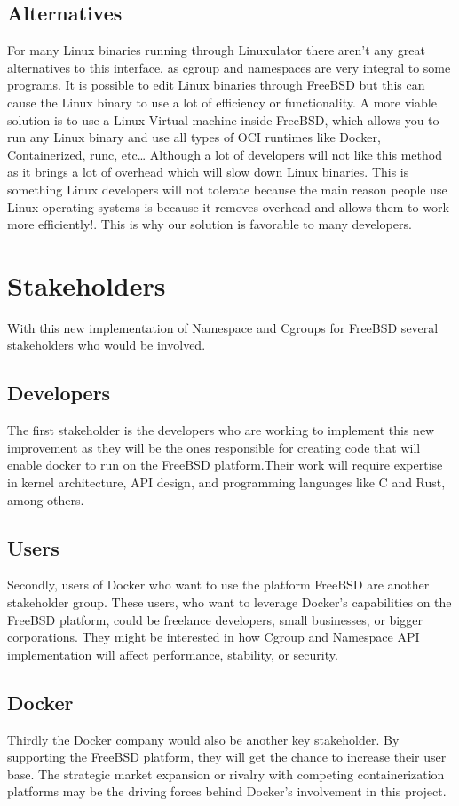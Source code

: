 \documentclass[12pt, dvipsnames, a4paper]{article}
\begin{document}
\subsection{Alternatives}
For many Linux binaries running through Linuxulator there aren't any great alternatives to this interface, as cgroup and namespaces are very integral to some programs. It is possible to edit Linux binaries through FreeBSD but this can cause the Linux binary to use a lot of efficiency or functionality. A more viable solution is to use a Linux Virtual machine inside FreeBSD, which allows you to run any Linux binary and use all types of OCI runtimes like Docker, Containerized, runc, etc… Although a lot of developers will not like this method as it brings a lot of overhead which will slow down Linux binaries. This is something Linux developers will not tolerate because the main reason people use Linux operating systems is because it removes overhead and allows them to work more efficiently!. This is why our solution is favorable to many developers.

\section{Stakeholders}
With this new implementation of Namespace and Cgroups for FreeBSD several stakeholders who would be involved.

\subsection{Developers}
The first stakeholder is the developers who are working to implement this new improvement as they will be the ones responsible for creating code that will enable docker to run on the FreeBSD platform.Their work will require expertise in kernel architecture, API design, and programming languages like C and Rust, among others.

\subsection{Users}
Secondly, users of Docker who want to use the platform FreeBSD are another stakeholder group. These users, who want to leverage Docker's capabilities on the FreeBSD platform, could be freelance developers, small businesses, or bigger corporations. They might be interested in how Cgroup and Namespace API implementation will affect performance, stability, or security.

\subsection{Docker}
Thirdly the Docker company would also be another key stakeholder. By supporting the FreeBSD platform, they will get the chance to increase their user base. The strategic market expansion or rivalry with competing containerization platforms may be the driving forces behind Docker's involvement in this project.
\end{document}
